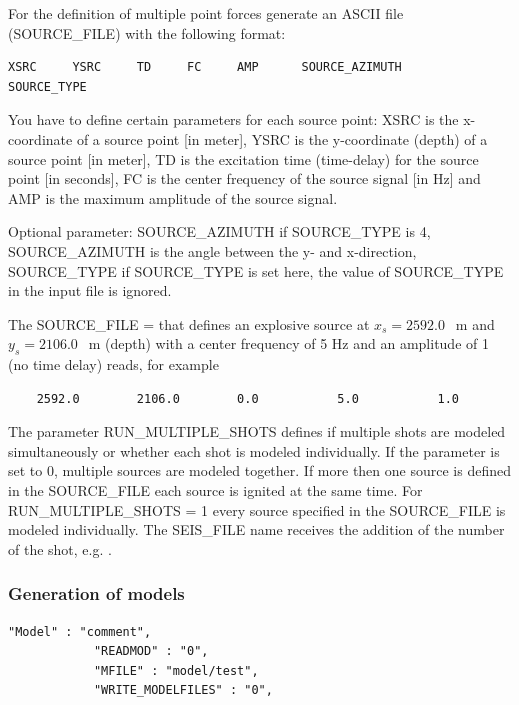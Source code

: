 \documentclass[11pt,onecolumn,oneside]{article}
\begin{document}
For the definition of multiple point forces generate an ASCII file (SOURCE\_FILE) with the following format:
\begin{verbatim}
XSRC     YSRC     TD     FC     AMP      SOURCE_AZIMUTH     SOURCE_TYPE
\end{verbatim}

You have to define certain parameters for each source point:\newline
XSRC is the x-coordinate of a source point [in meter],\newline
YSRC is the y-coordinate (depth) of a source point [in meter],\newline
TD is the excitation time (time-delay) for the source point [in seconds],\newline
FC is the center frequency of the source signal [in Hz] and\newline
AMP is the maximum amplitude of the source signal.

Optional parameter:\newline
SOURCE\_AZIMUTH if SOURCE\_TYPE is 4, SOURCE\_AZIMUTH is the angle between the y- and x-direction,\newline
SOURCE\_TYPE if SOURCE\_TYPE is set here, the value of SOURCE\_TYPE in the input file is ignored.

The SOURCE\_FILE =  that defines an explosive source at $x_s=2592.0\;$~m and $y_s=2106.0\;$~m (depth) with a center frequency of 5 Hz and an amplitude of 1 (no time delay) reads, for example
\begin{verbatim}
	2592.0        2106.0        0.0           5.0           1.0
\end{verbatim}

The parameter RUN\_MULTIPLE\_SHOTS defines if multiple shots are modeled simultaneously or whether each shot is modeled individually. If the parameter is set to 0, multiple sources are modeled together. If more then one source is defined in the SOURCE\_FILE each source is ignited at the same time. For RUN\_MULTIPLE\_SHOTS = 1 every source specified in the SOURCE\_FILE is modeled individually. The SEIS\_FILE name receives the addition of the number of the shot, e.g. .

\subsubsection{Generation of models}
\label{gen_of_mod}
\begin{verbatim}
"Model" : "comment",
			"READMOD" : "0",
			"MFILE" : "model/test",
			"WRITE_MODELFILES" : "0",
\end{verbatim}
\end{document}
